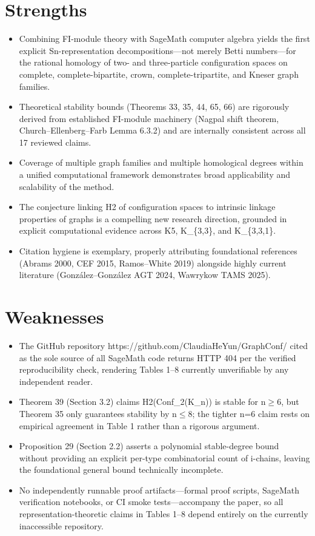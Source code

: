 \documentclass[11pt]{article}
\begin{document}
\section*{Strengths}
\begin{itemize}[leftmargin=*]
  \item Combining FI-module theory with SageMath computer algebra yields the first explicit Sn-representation decompositions---not merely Betti numbers---for the rational homology of two- and three-particle configuration spaces on complete, complete-bipartite, crown, complete-tripartite, and Kneser graph families.
  \item Theoretical stability bounds (Theorems 33, 35, 44, 65, 66) are rigorously derived from established FI-module machinery (Nagpal shift theorem, Church--Ellenberg--Farb Lemma 6.3.2) and are internally consistent across all 17 reviewed claims.
  \item Coverage of multiple graph families and multiple homological degrees within a unified computational framework demonstrates broad applicability and scalability of the method.
  \item The conjecture linking H2 of configuration spaces to intrinsic linkage properties of graphs is a compelling new research direction, grounded in explicit computational evidence across K5, K\_\{3,3\}, and K\_\{3,3,1\}.
  \item Citation hygiene is exemplary, properly attributing foundational references (Abrams 2000, CEF 2015, Ramos--White 2019) alongside highly current literature (González--González AGT 2024, Wawrykow TAMS 2025).
\end{itemize}

\section*{Weaknesses}
\begin{itemize}[leftmargin=*]
  \item The GitHub repository https://github.com/ClaudiaHeYun/GraphConf/ cited as the sole source of all SageMath code returns HTTP 404 per the verified reproducibility check, rendering Tables 1--8 currently unverifiable by any independent reader.
  \item Theorem 39 (Section 3.2) claims H2(Conf\_2(K\_n)) is stable for n\ensuremath{\ge}6, but Theorem 35 only guarantees stability by n\ensuremath{\le}8; the tighter n=6 claim rests on empirical agreement in Table 1 rather than a rigorous argument.
  \item Proposition 29 (Section 2.2) asserts a polynomial stable-degree bound without providing an explicit per-type combinatorial count of i-chains, leaving the foundational general bound technically incomplete.
  \item No independently runnable proof artifacts---formal proof scripts, SageMath verification notebooks, or CI smoke tests---accompany the paper, so all representation-theoretic claims in Tables 1--8 depend entirely on the currently inaccessible repository.
\end{itemize}
\end{document}
